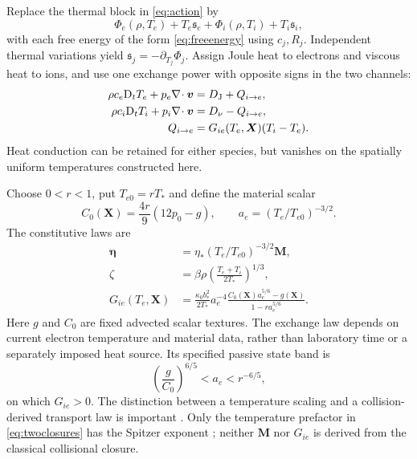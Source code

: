 \documentclass[11pt,a4paper]{article}
\theoremstyle{remark}\newtheorem{remark}{Remark}
\numberwithin{equation}{section}
\newcommand{\vv}{\boldsymbol v}
\newcommand{\MM}{\boldsymbol M}
\newcommand{\XX}{\boldsymbol X}
\newcommand{\etab}{\boldsymbol\eta}
\newcommand{\diver}{\nabla\!\cdot}
\newcommand{\Dt}{\mathrm D_t}
\newcommand{\st}{\mathfrak s}
\begin{document}
Replace the thermal block in \eqref{eq:action} by
\[
\Phi_e(\rho,T_e)+T_e\st_e+\Phi_i(\rho,T_i)+T_i\st_i,
\]
with each free energy of the form \eqref{eq:freeenergy} using $c_j,R_j$. Independent thermal variations yield $\st_j=-\partial_{T_j}\Phi_j$. Assign Joule heat to electrons and viscous heat to ions, and use one exchange power with opposite signs in the two channels:
\begin{equation}
\begin{aligned}
\rho c_e\Dt T_e+p_e\diver\vv&=D_{\rm J}+Q_{i\to e},\\
\rho c_i\Dt T_i+p_i\diver\vv&=D_\nu-Q_{i\to e},\\
Q_{i\to e}&=G_{ie}(T_e,\XX)(T_i-T_e).
\end{aligned}
\label{eq:twoheat}
\end{equation}
Heat conduction can be retained for either species, but vanishes on the spatially uniform temperatures constructed here.

Choose $0<r<1$, put $T_{e0}=rT_*$ and define the material scalar
\begin{equation}
C_0(\XX)=\frac{4r}{9}(12p_0-g),\qquad
a_e=(T_e/T_{e0})^{-3/2}.
\label{eq:Czero}
\end{equation}
The constitutive laws are
\begin{equation}
\begin{aligned}
\etab&=\eta_*(T_e/T_{e0})^{-3/2}\MM,\\
\zeta&=\beta\rho\left(\frac{T_e+T_i}{2T_*}\right)^{1/3},\\
G_{ie}(T_e,\XX)&=\frac{\kappa_0b_*^2}{2T_*}a_e^{-4}
\frac{C_0(\XX)a_e^{5/6}-g(\XX)}{1-r a_e^{5/6}}.
\end{aligned}
\label{eq:twoclosures}
\end{equation}
Here $g$ and $C_0$ are fixed advected scalar textures. The exchange law depends on current electron temperature and material data, rather than laboratory time or a separately imposed heat source. Its specified passive state band is
\begin{equation}
\left(\frac{g}{C_0}\right)^{6/5}<a_e<r^{-6/5},
\label{eq:exchangeband}
\end{equation}
on which $G_{ie}>0$. The distinction between a temperature scaling and a collision-derived transport law is important \citep{Spitzer,Braginskii1965,Lingam}. Only the temperature prefactor in \eqref{eq:twoclosures} has the Spitzer exponent \citep{Spitzer}; neither $\MM$ nor $G_{ie}$ is derived from the classical collisional closure.
\end{document}

